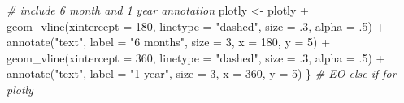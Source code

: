 \documentclass[
  11 pt,
  openany]{book}
\newenvironment{Shaded}{\begin{snugshade}}{\end{snugshade}}
\newcommand{\AttributeTok}[1]{\textcolor[rgb]{0.77,0.63,0.00}{#1}}
\newcommand{\CommentTok}[1]{\textcolor[rgb]{0.56,0.35,0.01}{\textit{#1}}}
\newcommand{\DecValTok}[1]{\textcolor[rgb]{0.00,0.00,0.81}{#1}}
\newcommand{\FunctionTok}[1]{\textcolor[rgb]{0.00,0.00,0.00}{#1}}
\newcommand{\NormalTok}[1]{#1}
\newcommand{\OtherTok}[1]{\textcolor[rgb]{0.56,0.35,0.01}{#1}}
\newcommand{\SpecialCharTok}[1]{\textcolor[rgb]{0.00,0.00,0.00}{#1}}
\newcommand{\StringTok}[1]{\textcolor[rgb]{0.31,0.60,0.02}{#1}}
\begin{document}
\begin{Shaded}
\begin{Highlighting}[]
  \CommentTok{\# include 6 month and 1 year annotation}
\NormalTok{  plotly }\OtherTok{\textless{}{-}}\NormalTok{ plotly }\SpecialCharTok{+}
    \FunctionTok{geom\_vline}\NormalTok{(}\AttributeTok{xintercept =} \DecValTok{180}\NormalTok{, }
               \AttributeTok{linetype =} \StringTok{"dashed"}\NormalTok{, }\AttributeTok{size =}\NormalTok{ .}\DecValTok{3}\NormalTok{, }\AttributeTok{alpha =}\NormalTok{ .}\DecValTok{5}\NormalTok{) }\SpecialCharTok{+}
    \FunctionTok{annotate}\NormalTok{(}\StringTok{"text"}\NormalTok{, }\AttributeTok{label =} \StringTok{"6 months"}\NormalTok{, }\AttributeTok{size =} \DecValTok{3}\NormalTok{,}
             \AttributeTok{x =} \DecValTok{180}\NormalTok{, }\AttributeTok{y =} \DecValTok{5}\NormalTok{) }\SpecialCharTok{+}
    \FunctionTok{geom\_vline}\NormalTok{(}\AttributeTok{xintercept =} \DecValTok{360}\NormalTok{,}
               \AttributeTok{linetype =} \StringTok{"dashed"}\NormalTok{, }\AttributeTok{size =}\NormalTok{ .}\DecValTok{3}\NormalTok{, }\AttributeTok{alpha =}\NormalTok{ .}\DecValTok{5}\NormalTok{) }\SpecialCharTok{+}
    \FunctionTok{annotate}\NormalTok{(}\StringTok{"text"}\NormalTok{, }\AttributeTok{label =} \StringTok{"1 year"}\NormalTok{, }\AttributeTok{size =} \DecValTok{3}\NormalTok{,}
             \AttributeTok{x =} \DecValTok{360}\NormalTok{, }\AttributeTok{y =} \DecValTok{5}\NormalTok{)}
\NormalTok{\} }\CommentTok{\# EO else if for plotly}


\end{Highlighting}
\end{Shaded}
\end{document}
